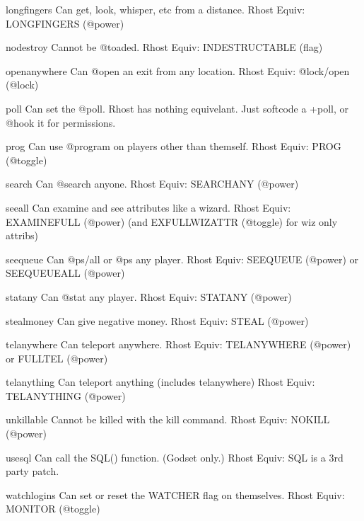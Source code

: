 \documentclass[letterpaper,10pt,english]{sphinxmanual}
\begin{document}
\begin{sphinxVerbatim}[commandchars=\\\{\}]
long\PYGZus{}fingers          Can get, look, whisper, etc from a distance.
Rhost Equiv: LONG\PYGZus{}FINGERS (@power)

no\PYGZus{}destroy            Cannot be @toad\PYGZsq{}ed.
Rhost Equiv: INDESTRUCTABLE (flag)

open\PYGZus{}anywhere         Can @open an exit from any location.
Rhost Equiv: @lock/open (@lock)

poll                  Can set the @poll.
Rhost has nothing equivelant.  Just softcode a +poll, or @hook it for permissions.

prog                  Can use @program on players other than themself.
Rhost Equiv: PROG (@toggle)

search                Can @search anyone.
Rhost Equiv: SEARCH\PYGZus{}ANY (@power)

see\PYGZus{}all               Can examine and see attributes like a wizard.
Rhost Equiv: EXAMINE\PYGZus{}FULL (@power) (and EXFULLWIZATTR (@toggle) for wiz only attribs)

see\PYGZus{}queue             Can @ps/all or @ps any player.
Rhost Equiv: SEE\PYGZus{}QUEUE (@power) or SEE\PYGZus{}QUEUE\PYGZus{}ALL (@power)

stat\PYGZus{}any              Can @stat any player.
Rhost Equiv: STAT\PYGZus{}ANY (@power)

steal\PYGZus{}money           Can give negative money.
Rhost Equiv: STEAL (@power)

tel\PYGZus{}anywhere          Can teleport anywhere.
Rhost Equiv: TEL\PYGZus{}ANYWHERE (@power) or FULL\PYGZus{}TEL (@power)

tel\PYGZus{}anything          Can teleport anything (includes tel\PYGZus{}anywhere)
Rhost Equiv: TEL\PYGZus{}ANYTHING (@power)

unkillable            Cannot be killed with the \PYGZsq{}kill\PYGZsq{} command.
Rhost Equiv: NOKILL (@power)

use\PYGZus{}sql               Can call the SQL() function. (God\PYGZhy{}set only.)
Rhost Equiv: SQL is a 3rd party patch.

watch\PYGZus{}logins          Can set or reset the WATCHER flag on themselves.
Rhost Equiv: MONITOR (@toggle)
\end{sphinxVerbatim}
\label{\detokenize{historical/nda:historical-nda}}
\ignorespaces 
\end{document}
